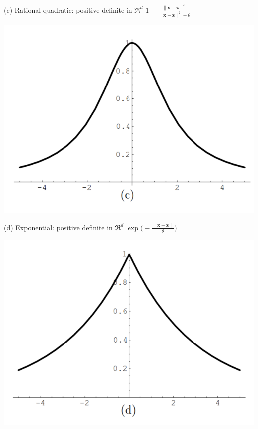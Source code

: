 \documentclass[
  ignorenonframetext,
]{beamer}
\begin{document}
\begin{frame}{}
\protect\hypertarget{section-8}{}
\begin{block}{(c) Rational quadratic:}
\protect\hypertarget{c-rational-quadratic}{}
positive definite in \(\mathfrak R^d\)
\(1 - \frac {\|\pmb x - \pmb z\|^2} {\|\pmb x - \pmb z\|^2 + \theta}\)

\begin{center}\includegraphics[width=0.5\linewidth]{figure/marc_f2c} \end{center}
\end{block}
\end{frame}

\begin{frame}{}
\protect\hypertarget{section-9}{}
\begin{block}{(d) Exponential:}
\protect\hypertarget{d-exponential}{}
positive definite in \(\mathfrak R^d\)
\(\exp \Big(- \frac {\|\pmb x - \pmb z\|} \theta \Big)\)

\begin{center}\includegraphics[width=0.5\linewidth]{figure/marc_f2d} \end{center}
\end{block}
\end{frame}
\end{document}
